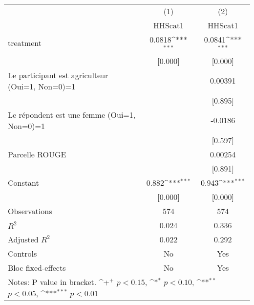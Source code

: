 {
\def\sym#1{\ifmmode^{#1}\else\(^{#1}\)\fi}
\begin{tabular*}{1.2\hsize}{@{\hskip\tabcolsep\extracolsep\fill}l*{2}{c}}
\cline{2-3}\cline{2-3}
     &\multicolumn{1}{c}{(1)}&\multicolumn{1}{c}{(2)}\\
     &\multicolumn{1}{c}{HHScat1}&\multicolumn{1}{c}{HHScat1}\\
\cline{2-3}
treatment&0.0818\sym{***}&0.0841\sym{***}\\
     &[0.000]         &[0.000]         \\
[1em]
Le participant est agriculteur (Oui=1, Non=0)=1&           &0.00391         \\
     &           &[0.895]         \\
[1em]
Le répondent est une femme (Oui=1, Non=0)=1&           &-0.0186         \\
     &           &[0.597]         \\
[1em]
Parcelle ROUGE&           &0.00254         \\
     &           &[0.891]         \\
[1em]
Constant&0.882\sym{***}&0.943\sym{***}\\
     &[0.000]         &[0.000]         \\
\cline{2-3}
Observations&574         &574         \\
\(R^{2}\)&0.024         &0.336         \\
Adjusted \(R^{2}\)&0.022         &0.292         \\
Controls&No         &Yes         \\
Bloc fixed-effects&No         &Yes         \\
\cline{2-3}\cline{2-3}
\multicolumn{3}{p{1.0\textwidth}}{\footnotesize Notes: P value in bracket. \sym{+} \(p<0.15\), \sym{*} \(p<0.10\), \sym{**} \(p<0.05\), \sym{***} \(p<0.01\)}\\
\end{tabular*}
}
